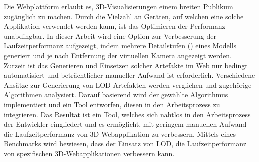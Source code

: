 Die Webplattform erlaubt es, 3D-Visualisierungen einem breiten Publikum zugänglich zu machen. Durch die Vielzahl an Geräten, auf welchen eine solche Applikation verwendet werden kann, ist das Optimieren der Performanz unabdingbar. In dieser Arbeit wird eine Option zur Verbesserung der Laufzeitperformanz aufgezeigt, indem mehrere Detailstufen () eines Modells generiert und je nach Entfernung der virtuellen Kamera angezeigt werden.
\bigbreak
Zurzeit ist das Generieren und Einsetzen solcher Artefakte im Web nur bedingt automatisiert und beträchtlicher manueller Aufwand ist erforderlich.
Verschiedene Ansätze zur Generierung von LOD-Artefakten werden verglichen und zugehörige Algorithmen analysiert.
Darauf basierend wird der gewählte Algorithmus implementiert und ein Tool entworfen, diesen in den Arbeitsprozess zu integrieren.
\bigbreak
Das Resultat ist ein Tool, welches sich nahtlos in den Arbeitsprozess der Entwickler eingliedert und es ermöglicht, mit geringem manuellen Aufwand die Laufzeitperformanz von 3D-Webapplikation zu verbessern.
Mittels eines Benchmarks wird bewiesen, dass der Einsatz von LOD, die Laufzeitperformanz von spezifischen 3D-Webapplikationen verbessern kann.
